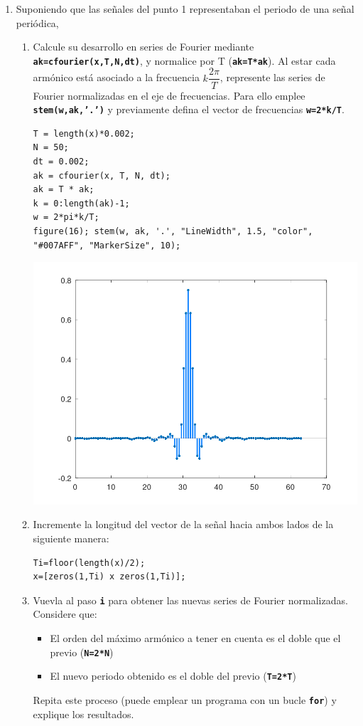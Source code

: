 \documentclass{article}
\newcommand{\code}[1]{\texttt{\textbf{#1}}}
\begin{document}
\begin{enumerate}[leftmargin=*]
\item Suponiendo que las señales del punto 1 representaban el periodo de una señal periódica,
\begin{enumerate}[label=\roman*)]
\item Calcule su desarrollo en series de Fourier mediante \code{ak=cfourier(x,T,N,dt)}, y normalice por T (\code{ak=T*ak}). Al estar cada armónico está asociado a la frecuencia $k\dfrac{2\pi}{T}$, represente las series de Fourier normalizadas en el eje de frecuencias. Para ello emplee \code{stem(w,ak,'.')} y previamente defina el vector de frecuencias \code{w=2*\textpi*k/T}.
\begin{lstlisting}
T = length(x)*0.002;
N = 50;
dt = 0.002;
ak = cfourier(x, T, N, dt);
ak = T * ak;
k = 0:length(ak)-1;
w = 2*pi*k/T;
figure(16); stem(w, ak, '.', "LineWidth", 1.5, "color", "#007AFF", "MarkerSize", 10);
\end{lstlisting}
\begin{center}
\includegraphics[width=0.7\linewidth]{Imágenes/Figura16}
\end{center}
\item Incremente la longitud del vector de la señal hacia ambos lados de la siguiente manera:
\begin{lstlisting}
Ti=floor(length(x)/2);
x=[zeros(1,Ti) x zeros(1,Ti)];
\end{lstlisting}
\item Vuevla al paso \code{i} para obtener las nuevas series de Fourier normalizadas. Considere que:
\begin{itemize}[label=$-$]
\item El orden del máximo armónico a tener en cuenta es el doble que el previo (\code{N=2*N})
\item El nuevo periodo obtenido es el doble del previo (\code{T=2*T})
\end{itemize}
Repita este proceso (puede emplear un programa con un bucle \code{for}) y explique los resultados.

\end{enumerate}
\end{enumerate}
\end{document}
